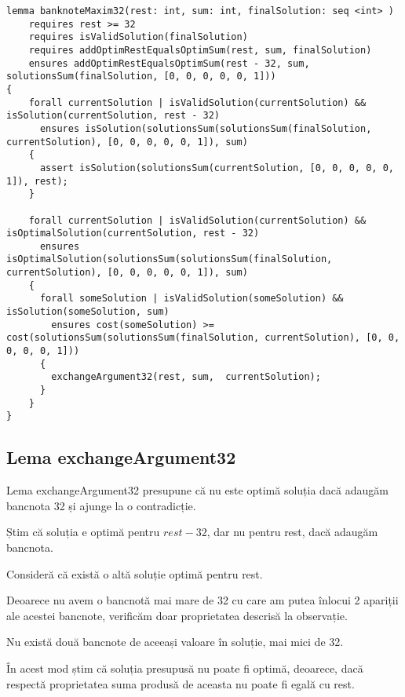\begin{lstlisting}
lemma banknoteMaxim32(rest: int, sum: int, finalSolution: seq <int> )
    requires rest >= 32
    requires isValidSolution(finalSolution)
    requires addOptimRestEqualsOptimSum(rest, sum, finalSolution)
    ensures addOptimRestEqualsOptimSum(rest - 32, sum, solutionsSum(finalSolution, [0, 0, 0, 0, 0, 1])) 
{
    forall currentSolution | isValidSolution(currentSolution) && isSolution(currentSolution, rest - 32)
      ensures isSolution(solutionsSum(solutionsSum(finalSolution, currentSolution), [0, 0, 0, 0, 0, 1]), sum) 
    {
      assert isSolution(solutionsSum(currentSolution, [0, 0, 0, 0, 0, 1]), rest);
    }
  
    forall currentSolution | isValidSolution(currentSolution) && isOptimalSolution(currentSolution, rest - 32)
      ensures isOptimalSolution(solutionsSum(solutionsSum(finalSolution, currentSolution), [0, 0, 0, 0, 0, 1]), sum)
    {
      forall someSolution | isValidSolution(someSolution) && isSolution(someSolution, sum)
        ensures cost(someSolution) >= cost(solutionsSum(solutionsSum(finalSolution, currentSolution), [0, 0, 0, 0, 0, 1])) 
      {
        exchangeArgument32(rest, sum,  currentSolution);
      }
    }
}
\end{lstlisting}


\subsection{Lema exchangeArgument32}
Lema exchangeArgument32 presupune că nu este optimă soluția dacă adaugăm bancnota 32 și ajunge la o contradicție.\par
Știm că soluția e optimă pentru $rest - 32$, dar nu pentru rest, dacă adaugăm bancnota.\par
Consideră că există o altă soluție optimă pentru rest.\par
Deoarece nu avem o bancnotă mai mare de 32 cu care am putea înlocui 2 apariții ale acestei bancnote,
verificăm doar proprietatea descrisă la observație.\par
Nu există două bancnote de aceeași valoare în soluție, mai mici de 32.\par
În acest mod știm că soluția presupusă nu poate fi optimă, deoarece, dacă respectă proprietatea
suma produsă de aceasta nu poate fi egală cu rest. \par

